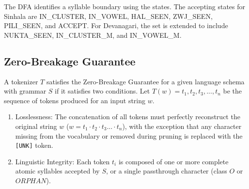 The DFA identifies a syllable boundary using the states. The accepting states for Sinhala are IN\_CLUSTER, IN\_VOWEL, HAL\_SEEN, ZWJ\_SEEN, PILI\_SEEN, and ACCEPT. For Devanagari, the set is extended to include NUKTA\_SEEN, IN\_CLUSTER\_M, and IN\_VOWEL\_M.

\subsection{Zero-Breakage Guarantee}
\begin{definition}A tokenizer $T$ satisfies the Zero-Breakage Guarantee for a given language schema with grammar $S$ if it satisfies two conditions.
Let $T(w) = t_1,t_2,t_3,...,t_n$ be the sequence of tokens produced for an input string $w$.
\begin{enumerate}
    \item Losslessness: The concatenation of all tokens must perfectly reconstruct the original string $w$ ($w = t_1\cdot t_2 \cdot t_3 ... \cdot t_n$), with the exception that any character missing from the vocabulary or removed during pruning is replaced with the \texttt{[UNK]} token.
    \item Linguistic Integrity:   Each token $t_i$ is composed of one or more complete atomic syllables accepted by $S$, or a single passthrough character (class $O$ or $ORPHAN$).
\end{enumerate}
\end{definition}